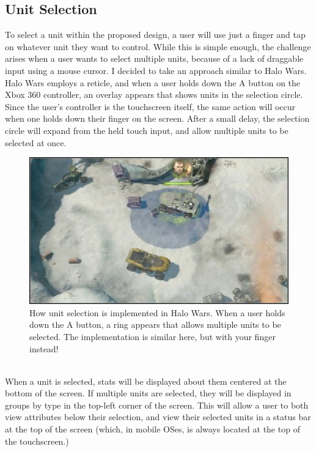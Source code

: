 \documentclass[11pt]{article}
\begin{document}
	\subsection{Unit Selection}
	To select a unit within the proposed design, a user will use just a finger and tap on whatever unit they want to control. While this is simple enough, the challenge arises when a user wants to select multiple units, because of a lack of draggable input using a mouse cursor. I decided to take an approach similar to Halo Wars. Halo Wars employs a reticle, and when a user holds down the A button on the Xbox 360 controller, an overlay appears that shows units in the selection circle. Since the user's controller is the touchscreen itself, the same action will occur when one holds down their finger on the screen. After a small delay, the selection circle will expand from the held touch input, and allow multiple units to be selected at once.
	\begin{figure}[h]
	\begin{center}
	\includegraphics[height = 2.5in]{blue-selection}
	\caption{How unit selection is implemented in Halo Wars. When a user holds down the A button, a ring appears that allows multiple units to be selected. The implementation is similar here, but with your finger instead!}
	\end{center}
	\end{figure} \\
	\indent When a unit is selected, stats will be displayed about them centered at the bottom of the screen. If multiple units are selected, they will be displayed in groups by type in the top-left corner of the screen. This will allow a user to both view attributes below their selection, and view their selected units in a status bar at the top of the screen (which, in mobile OSes, is always located at the top of the touchscreen.)
\end{document}
